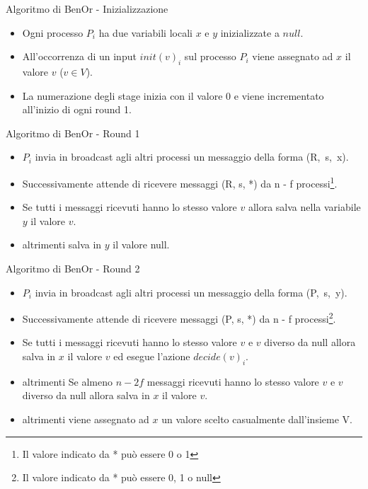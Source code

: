 \documentclass{beamer}
\begin{document}
    \begin{frame}{Algoritmo di BenOr - Inizializzazione}
        \begin{itemize}
            \item Ogni processo $P_{i}$ ha due variabili locali $x$ e $y$ inizializzate a $null$.

            \item All'occorrenza di un input $init(v)_{i}$ sul processo $P_{i}$ viene assegnato ad $x$ il valore $v$ ($v \in V$).

            \item La numerazione degli stage inizia con il valore 0 e viene incrementato all'inizio di ogni round 1.
        \end{itemize}
    \end{frame}


    \begin{frame}{Algoritmo di BenOr - Round 1}
        \begin{itemize}
            \item $P_{i}$ invia in broadcast agli altri processi un messaggio della forma \mbox{(R, s, x)}.

            \item Successivamente attende di ricevere messaggi (R, s, *) da n - f processi\footnote{Il valore indicato da * può essere 0 o 1}.

            \item Se tutti i messaggi ricevuti hanno lo stesso valore $v$ allora salva nella variabile $y$ il valore $v$.

            \item altrimenti salva in $y$ il valore null.

        \end{itemize}
    \end{frame}


    \begin{frame}{Algoritmo di BenOr - Round 2}

        \begin{itemize}
            \item $P_{i}$ invia in broadcast agli altri processi un messaggio della forma \mbox{(P, s, y)}.

            \item Successivamente attende di ricevere messaggi (P, s, *) da n - f processi\footnote{Il valore indicato da * può essere 0, 1 o null}.

            \item Se tutti i messaggi ricevuti hanno lo stesso valore $v$ e $v$ diverso da null allora salva in $x$ il valore $v$ ed esegue l'azione $decide(v)_{i}$.

            \item altrimenti Se almeno $n - 2f$ messaggi ricevuti hanno lo stesso valore $v$ e $v$ diverso da null allora salva in $x$ il valore $v$.

            \item altrimenti viene assegnato ad $x$ un valore scelto casualmente dall'insieme V.
        \end{itemize}
    \end{frame}
\end{document}
